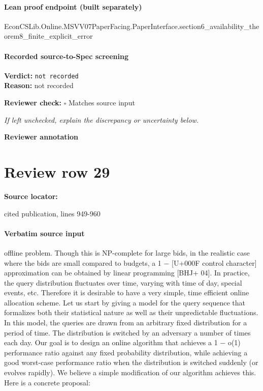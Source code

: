 \documentclass[10pt]{article}
\newcommand{\reviewerbox}{%
  \par\noindent\fbox{\parbox{0.96\linewidth}{\rule{0pt}{0.38in}}}\par
}
\newcommand{\reviewmatch}[1]{%
  \par\noindent\textbf{Reviewer check:} $\square$\; #1\par
  \noindent\emph{If left unchecked, explain the discrepancy or uncertainty below.}\par
}
\begin{document}
\paragraph{Lean proof endpoint (built separately)}\begin{ReviewVerbatim}
EconCSLib.Online.MSVV07PaperFacing.PaperInterface.section6_availability_theorem8_finite_explicit_error
\end{ReviewVerbatim}

\paragraph{Recorded source-to-Spec screening}
\textbf{Verdict:} \texttt{not recorded}
\\
\textbf{Reason:} not recorded
\reviewmatch{Matches source input}
\noindent\textbf{Reviewer annotation}\par
\reviewerbox
\clearpage
\hypertarget{source-claim-8a3793465d7da5b7}{}
\section*{Review row 29}
\textbf{Source locator:} {\footnotesize\raggedright cited publication, lines 949-\allowbreak{}960\par}
\paragraph{Verbatim source input}
\begin{ReviewVerbatim}
offline problem. Though this is NP-complete for large bids, in the realistic case where the bids
are small compared to budgets, a 1 − [U+000F control character] approximation can be obtained by linear programming
[BHJ+ 04]. In practice, the query distribution fluctuates over time, varying with time of day,
special events, etc. Therefore it is desirable to have a very simple, time efficient online allocation
scheme.
Let us start by giving a model for the query sequence that formalizes both their statistical
nature as well as their unpredictable fluctuations. In this model, the queries are drawn from an
arbitrary fixed distribution for a period of time. The distribution is switched by an adversary
a number of times each day. Our goal is to design an online algorithm that achieves a 1 − o(1)
performance ratio against any fixed probability distribution, while achieving a good worst-case
performance ratio when the distribution is switched suddenly (or evolves rapidly).
We believe a simple modification of our algorithm achieves this. Here is a concrete proposal:
\end{ReviewVerbatim}
\end{document}
